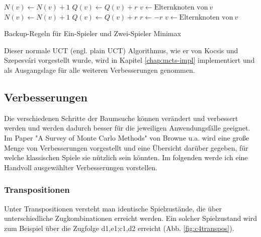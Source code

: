 \begin{algorithm}[H]
\begin{algorithmic}		
 
		\State $N(v) \gets N(v) + 1$
		\State $Q(v) \gets Q(v) + r$
		\State $v \gets \text{Elternknoten von}\ v$
	\EndWhile
\EndFunction\\

 
		\State $N(v) \gets N(v) + 1$
		\State $Q(v) \gets Q(v) + r$
		\State $r \gets -r$
		\State $v \gets \text{Elternknoten von}\ v$
	\EndWhile
\EndFunction
\end{algorithmic}
\caption{Backup-Regeln für Ein-Spieler und Zwei-Spieler Minimax}
\end{algorithm}

Dieser normale UCT (engl. plain UCT) Algorithmus, wie er von Kocsis und Szepesv\'{a}ri vorgestellt wurde, wird in Kapitel \ref{chap:mcts-impl} implementiert und als Ausgangslage für alle weiteren Verbesserungen genommen. 

\subsection{Verbesserungen}

Die verschiedenen Schritte der Baumsuche können verändert und verbessert werden und werden dadurch besser für die jeweiligen Anwendungsfälle geeignet. Im Paper "A Survey of Monte Carlo Methods" von Browne u.a.\autocite{browneSurveyMonteCarlo2012} wird eine große Menge von Verbesserungen vorgestellt und eine Übersicht darüber gegeben, für welche klassischen Spiele sie nützlich sein könnten. Im folgenden werde ich eine Handvoll ausgewählter Verbesserungen vorstellen.

\subsubsection{Transpositionen}
\label{transpos}
Unter Transpositionen versteht man identische Spielzustände, die über unterschiedliche Zugkombinationen erreicht werden. Ein solcher Spielzustand wird zum Beispiel über die Zugfolge d1,e1;c1,d2 erreicht (Abb. \ref{fig:c4transpos}).

